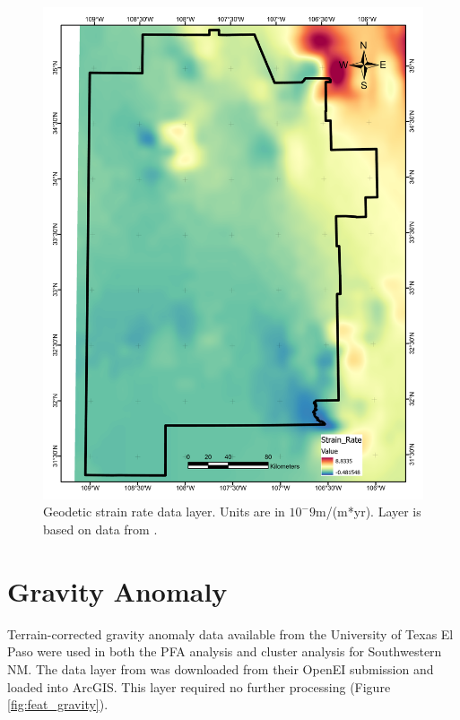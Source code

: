 \begin{figure}[H]
\centering
\includegraphics[width=0.75\linewidth]{templates/images/Figure-StrainRate.pdf}
\caption[Geodetic strain rate data layer]{Geodetic strain rate data layer. Units are in $10^-9$m/(m*yr). Layer is based on data from \protect\citet{kreemer_geodetic_2014}.}
\label{fig:feat_strain}
\end{figure}
\pagebreak

\section{Gravity Anomaly}\label{app:dl_grav_anomaly}
Terrain-corrected gravity anomaly data available from the University of Texas El Paso \citep{utep_gravity_2011} were used in both the PFA analysis \citep{bielicki_hydrogeolgic_2015} and cluster analysis \citep{pepin_new_2018} for Southwestern NM. The data layer from \citet{bielicki_hydrogeolgic_2015} was downloaded from their OpenEI submission \citep{kelley_geothermal_2015} and loaded into ArcGIS. This layer required no further processing (Figure \ref{fig:feat_gravity}).

